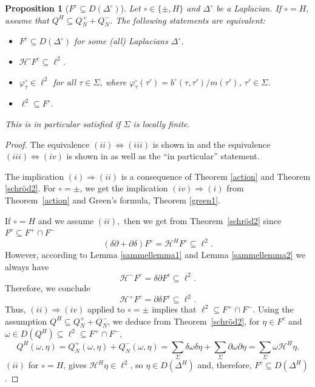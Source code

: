 \documentclass[10pt]{amsart}
\newtheorem{proposition}[theorem]{Proposition}
\theoremstyle{definition}
\newcommand{\F}{{F}}
\renewcommand{\bullet}{{\circ}}
\begin{document}
\begin{proposition}[$\F^{c}\subseteq D(\Delta^{\circ})$]\label{prop:Fc} 	
	Let $\bullet\in\{\pm,H\}$ and $\Delta^\bullet$ be a Laplacian. If $\bullet = H,$ assume that $Q^H\subseteq Q^{+}_N+Q^{-}_N$.
	The following statements are equivalent:
	\begin{itemize}
		\item [(i)] $\F^{c}\subseteq D(\Delta^{\circ})$ for some (all) Laplacians $\Delta^{\bullet}$.
		\item [(ii)]  $\mathcal{H}^\bullet\F^c\subseteq\ell^2$.
		\item [(iii)] $\varphi^{\bullet}_{\tau}\in \ell^{2}$ for all $\tau\in \Sigma$, where $\varphi^\bullet_\tau(\tau')={b^\bullet(\tau,\tau')}/{m(\tau')}$, $\tau'\in \Sigma$.
		\item [(iv)]  $\ell^{2}\subseteq \F^{\bullet}$.
	\end{itemize}
	This is in particular satisfied if $\Sigma$ is locally finite.
\end{proposition}
\begin{proof}
The equivalence $(ii)\Longleftrightarrow(iii)$ is shown in \cite[Lemma~2.11]{GKS} and the equivalence $(iii)\Longleftrightarrow(iv)$ is shown in \cite[Theorem~1.29]{KLW} as well as the ``in particular'' statement. 

The implication $(i)\Longrightarrow(ii)$ is a consequence of Theorem \ref{action} and Theorem \ref{schröd2}. For $\bullet = \pm$, we get the implication $(iv)\Longrightarrow(i)$ from Theorem~\ref{action} and Green's formula, Theorem \ref{green1}. 

If $\bullet = H$ and we assume $(ii),$ then we get from Theorem~\ref{schröd2} since $F^{c}\subseteq F^{+}\cap F^{-}$ $$(\delta\partial+\partial\delta)F^c=\mathcal{H}^{H}F^{c}\subseteq\ell^2.$$ However, according to Lemma \ref{sammellemma1} and Lemma \ref{sammellemma2} we always have $$\mathcal{H}^-F^c = \delta\partial F^c\subseteq\ell^2.$$ Therefore, we conclude 
\begin{equation*}
	\mathcal{H}^+F^c = \partial \delta F^c\subseteq\ell^2.
\end{equation*}
Thus, $(ii) \Longrightarrow (iv)$ applied to $\bullet=\pm$ implies
that $\ell^2\subseteq F^+\cap F^-.$
Using the assumption $Q^{H}\subseteq Q^{+}_N+Q^{-}_N$, we deduce from  Theorem~\ref{schröd2}, for $\eta\in F^{c}$ and $\omega\in D(Q^{H})\subseteq \ell^{2}\subseteq F^{+}\cap F^{-}$,
\begin{equation*}
	Q^{H}(\omega,\eta)=	Q^{+}_N(\omega,\eta)+	Q^{-}_N(\omega,\eta)=\sum_{\Sigma}\delta\omega \delta\eta+  \sum_{\Sigma}\partial\omega\partial\eta=\sum_{\Sigma} \omega \mathcal{H}^{H}\eta.
\end{equation*}
 $ (ii)$ for $\bullet=H$, gives $\mathcal{H}^{H} \eta\in\ell^{2}$, so  $\eta\in D(\Delta^{H})$ and, therefore, $F^{c}\subseteq D(\Delta^{H})$.
\end{proof}
\end{document}
